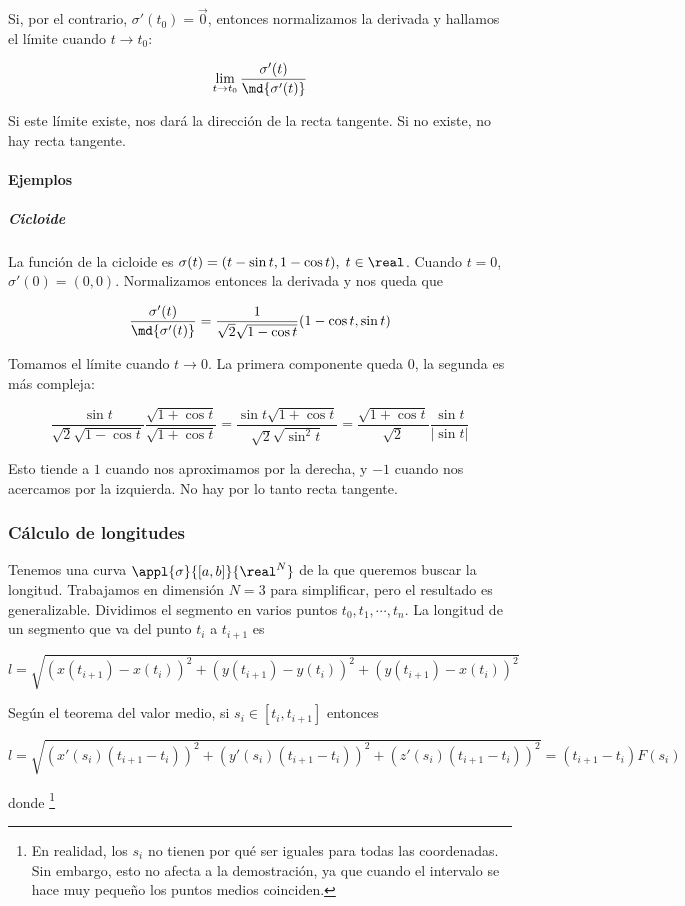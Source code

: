 \documentclass[nochap]{apuntes}
\begin{document}
Si, por el contrario, $\sigma'(t_0) = \vec{0}$, entonces normalizamos la derivada y hallamos el límite cuando $t\to t_0$:

\[ \lim_{t\to t_0} \frac{\sigma'(t)}{\md{\sigma'(t)}} \]

Si este límite existe, nos dará la dirección de la recta tangente. Si no existe, no hay recta tangente.

\paragraph{Ejemplos}
\subparagraph{Cicloide}

La función de la cicloide es $\sigma(t) = (t - \sin t, 1 - \cos t),\; t\in \real$. Cuando $t=0$, $\sigma'(0) = (0,0)$. Normalizamos entonces la derivada y nos queda que 

\[ \frac{\sigma'(t)}{\md{\sigma'(t)}} = \frac{1}{\sqrt{2}\sqrt{1 - \cos t}} (1 - \cos t, \sin t) \]

Tomamos el límite cuando $t\to 0$. La primera componente queda $0$, la segunda es más compleja:

\[ \frac{\sin t}{\sqrt{2}\sqrt{1 - \cos t}}\frac{ \sqrt{1 + \cos t}}{ \sqrt{1 + \cos t}} = \frac{\sin t \sqrt{1 + \cos t}}{\sqrt{2} \sqrt{\sin^2 t}} = \frac{\sqrt{1 + \cos t}}{\sqrt{2}} \frac{\sin t}{|\sin t |} \]

Esto tiende a $1$ cuando nos aproximamos por la derecha, y $-1$ cuando nos acercamos por la izquierda. No hay por lo tanto recta tangente.

\subsubsection{Cálculo de longitudes}
\label{refLong}
Tenemos una curva $\appl{\sigma}{[a,b]}{\real^N}$ de la que queremos buscar la longitud. Trabajamos en dimensión $N=3$ para simplificar, pero el resultado es generalizable. Dividimos el segmento en varios puntos $t_0, t_1, \cdots, t_n$. La longitud de un segmento que va del punto $t_i$ a $t_{i+1}$ es

\[ l = \sqrt{(x(t_{i+1}) - x(t_i) )^2 + (y(t_{i+1}) - y(t_i) )^2 + (y(t_{i+1}) - x(t_i) )^2} \]

Según el teorema del valor medio, si $s_i \in [t_i, t_{i+1}]$ entonces

\[ l = \sqrt{(x'(s_i)(t_{i+1}-t_i))^2+(y'(s_i)(t_{i+1}-t_i))^2+(z'(s_i)(t_{i+1}-t_i))^2} = (t_{i+1}-t_i)F(s_i) \]

donde \footnote{ En realidad, los $s_i$ no tienen por qué ser iguales para todas las coordenadas. Sin embargo, esto no afecta a la demostración, ya que cuando el intervalo se hace muy pequeño los puntos medios coinciden. }
\end{document}
